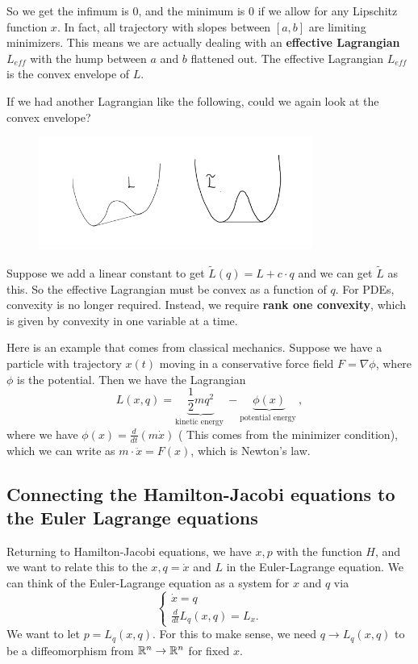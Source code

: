 \begin{remark}
\begin{itemize}
\begin{figure}[H]
        \end{figure}
        So we get the infimum is $0$, and the minimum is $0$ if we allow for any Lipschitz function $x$. In fact, all trajectory with slopes between $[a,b]$ are limiting minimizers. This means we are actually dealing with an \textbf{effective Lagrangian} $L_{eff}$ with the hump between $a$ and $b$ flattened out. The effective Lagrangian $L_{eff}$ is the convex envelope of $L$.

        If we had another Lagrangian like the following, could we again look at the convex envelope? 
        \begin{figure}[H]
            \centering
            \includegraphics[width=0.8\textwidth]{pics/8-2.png}
        \end{figure}
        Suppose we add a linear constant to get $\widetilde{L}(q) = L+c\cdot q$ and we can get $\widetilde{L}$ as this. So the effective Lagrangian must be convex as a function of $q$. For PDEs, convexity is no longer required. Instead, we require \textbf{rank one convexity}, which is given by convexity in one variable at a time.
    \end{itemize}
\end{remark}

\begin{example}
    Here is an example that comes from classical mechanics. Suppose we have a particle with trajectory $x(t)$ moving in a conservative force field $F = \nabla \phi$, where $\phi$ is the potential. Then we have the Lagrangian 
    \[
        L(x, q)=\underbrace{\frac{1}{2} m q^{2}}_{\text {kinetic energy }}-\underbrace{\phi(x)}_{\text {potential energy }},
    \] 
    where we have $\phi(x) = \frac{d}{dt}(m\dot x)$ ( This comes from the minimizer condition), which we can write as $m\cdot \ddot x = F(x)$, which is Newton's law.
\end{example}

\subsection{Connecting the Hamilton-Jacobi equations to the Euler Lagrange equations}
Returning to Hamilton-Jacobi equations, we have $x,p$ with the function $H$, and we want to relate this to the $x, q=\dot x$ and $L$ in the Euler-Lagrange equation. We can think of the Euler-Lagrange equation as a system for $x$ and $q$ via 
\[
\begin{cases}
    \dot x = q\\
    \frac d {dt} L_q(x,q) = L_x.
\end{cases}
\]
We want to let $p= L_q(x,q)$. For this to make sense, we need $q\to L_q(x,q)$ to be a diffeomorphism from $\mathbb{R}^n\to \mathbb{R}^n$ for fixed $x$.


